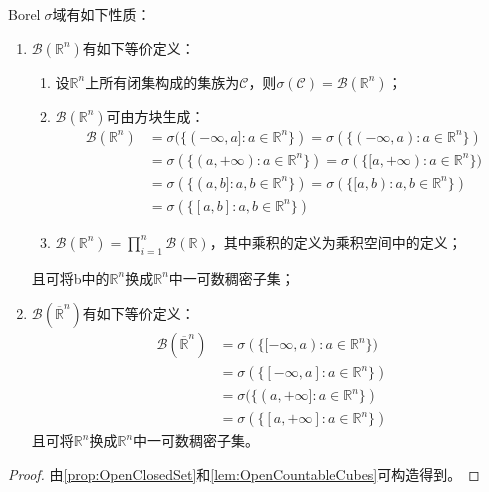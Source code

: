 \begin{property}\label{prop:BorelSigmaField}
	Borel$\;\sigma$域有如下性质：
	\begin{enumerate}
		\item $\mathcal{B}(\mathbb{R}^{n})$有如下等价定义：
		\begin{enumerate}
			\item 设$\mathbb{R}^{n}$上所有闭集构成的集族为$\mathcal{C}$，则$\sigma(\mathcal{C})=\mathcal{B}(\mathbb{R}^{n})$；
			\item $\mathcal{B}(\mathbb{R}^{n})$可由方块生成：
			\begin{align*}
				\mathcal{B}(\mathbb{R}^{n})&=\sigma(\{(-\infty,a]:a\in\mathbb{R}^{n}\})=\sigma(\{(-\infty,a):a\in\mathbb{R}^{n}\}) \\
				&=\sigma(\{(a,+\infty):a\in\mathbb{R}^{n}\})=\sigma(\{[a,+\infty):a\in\mathbb{R}^{n}\}) \\
				&=\sigma(\{(a,b]:a,b\in\mathbb{R}^{n}\})=\sigma(\{[a,b):a,b\in\mathbb{R}^{n}\}) \\
				&=\sigma(\{[a,b]:a,b\in\mathbb{R}^{n}\})
			\end{align*}
			\item $\mathcal{B}(\mathbb{R}^{n})=\prod\limits_{i=1}^{n}\mathcal{B}(\mathbb{R})$，其中乘积的定义为乘积空间中的定义；
		\end{enumerate}
		且可将b中的$\mathbb{R}^{n}$换成$\mathbb{R}^{n}$中一可数稠密子集；
		\item $\mathcal{B}(\overline{\mathbb{R}}^{n})$有如下等价定义：
		\begin{align*}
			\mathcal{B}(\overline{\mathbb{R}}^{n})
			&=\sigma(\{[-\infty,a):a\in\mathbb{R}^{n}\}) \\
			&=\sigma(\{[-\infty,a]:a\in\mathbb{R}^{n}\}) \\
			&=\sigma(\{(a,+\infty]:a\in\mathbb{R}^{n}\}) \\
			&=\sigma(\{[a,+\infty]:a\in\mathbb{R}^{n}\})
		\end{align*}
		且可将$\mathbb{R}^{n}$换成$\mathbb{R}^{n}$中一可数稠密子集。
	\end{enumerate}
\end{property}
\begin{proof}
	由\cref{prop:OpenClosedSet}和\cref{lem:OpenCountableCubes}可构造得到。
\end{proof}
